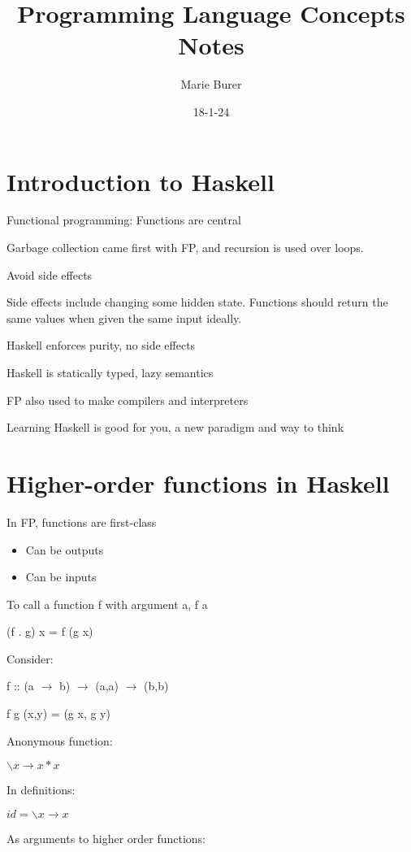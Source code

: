 \documentclass[12pt]{article}
\title{Programming Language Concepts Notes}
\author{Marie Burer}
\date{18-1-24}
\begin{document}
\maketitle
\newpage
\setlength{\parindent}{0pt}

\tableofcontents

\newpage

\section{Introduction to Haskell}

Functional programming: Functions are central

Garbage collection came first with FP, and recursion is used over loops.

Avoid side effects

Side effects include changing some hidden state. Functions should return the same values when given the same input ideally.

Haskell enforces purity, no side effects

Haskell is statically typed, lazy semantics

FP also used to make compilers and interpreters

Learning Haskell is good for you, a new paradigm and way to think

\section{Higher-order functions in Haskell}

In FP, functions are first-class
\begin{itemize}
    \item Can be outputs
    \item Can be inputs
\end{itemize}

To call a function f with argument a, f a

(f . g) x = f (g x)

Consider:

f :: (a $\to$ b) $\to$ (a,a) $\to$ (b,b)

f g (x,y) = (g x, g y)

Anonymous function:

$\backslash x \to x * x$

In definitions:

$id = \backslash x \to x$

As arguments to higher order functions:
\end{document}
